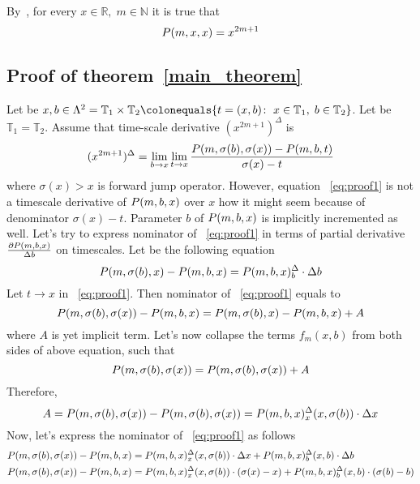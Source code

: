 By~\cite[Lemma 3.1]{kolosov2016link}, for every $x\in\mathbb{R}, \; m\in\mathbb{N}$ it is true that
\begin{equation}
    \label{eq:odd_power_identity}
    P ( m, x, x ) = x^{2m+1}
\end{equation}

\subsection{Proof of theorem~\ref{main_theorem}}
\label{subsec:proof-of-theorem}
Let be
$x,b\in \Lambda^2 = \mathbb{T}_1 \times \mathbb{T}_2
\colonequals \{t = (x,b) \colon \; x\in\mathbb{T}_1, \; b\in\mathbb{T}_2\}$.
Let be $\mathbb{T}_1 = \mathbb{T}_2$.
Assume that time-scale derivative $(x^{2m+1})^{\Delta}$ is
\begin{equation}
    \label{eq:proof1}
    (x^{2m+1})^{\Delta}
    = \lim \limits_{b \to x}
    \lim \limits_{t \to x}
    \frac{P ( m, \sigma(b), \sigma(x) ) - P ( m, b, t )}{\sigma(x) - t}
\end{equation}
where $\sigma(x) > x$ is forward jump operator.
However, equation ~\eqref{eq:proof1} is not a timescale derivative of $P ( m, b, x )$ over $x$
how it might seem because of denominator $\sigma(x) - t$.
Parameter $b$ of $P ( m, b, x )$ is implicitly incremented as well.
Let's try to express nominator of ~\eqref{eq:proof1} in terms of
partial derivative $\frac{\partial P ( m, b, x )}{\Delta b}$ on timescales.
Let be the following equation
\[
    P ( m, \sigma(b), x ) - P ( m, b, x )
    = P ( m, b, x )^{\Delta}_{b} \cdot \Delta b
\]
Let $t \to x$ in ~\eqref{eq:proof1}.
Then nominator of ~\eqref{eq:proof1} equals to
\[
    P ( m, \sigma(b), \sigma(x) ) - P ( m, b, x )
    = P ( m, \sigma(b), x ) - P ( m, b, x ) + A
\]
where $A$ is yet implicit term.
Let's now collapse the terms $f_m (x, b)$ from both sides of above equation, such that
\[
    P ( m, \sigma(b), \sigma(x) ) = P ( m, \sigma(b), \sigma(x) ) + A
\]
Therefore,
\[
    A = P ( m, \sigma(b), \sigma(x) ) - P ( m, \sigma(b), \sigma(x) )
    = P ( m, b, x )^{\Delta}_{x} (x, \sigma(b)) \cdot \Delta x
\]
Now, let's express the nominator of ~\eqref{eq:proof1} as follows
\begin{align*}
    P ( m, \sigma(b), \sigma(x) ) - P ( m, b, x )
    &= P ( m, b, x )^{\Delta}_{x} (x, \sigma(b)) \cdot \Delta x + P ( m, b, x )^{\Delta}_{b} (x,b) \cdot \Delta b \\
    P ( m, \sigma(b), \sigma(x) ) - P ( m, b, x )
    &= P ( m, b, x )^{\Delta}_{x} (x, \sigma(b)) \cdot (\sigma(x) - x) + P ( m, b, x )^{\Delta}_{b} (x,b) \cdot (\sigma(b) - b)
\end{align*}
